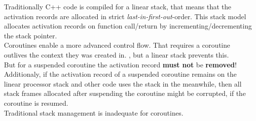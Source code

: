 Traditionally C++ code is compiled for a linear stack, that means that the
activation records are allocated in strict \emph{last-in-first-out}-order. This
stack model allocates activation records on function call/return by
incrementing/decrementing the stack pointer.\\
Coroutines enable a more advanced control flow. That requires a coroutine
outlives the context they was created in. , but a linear stack prevents this.\\
But for a suspended coroutine the activation record {\bfseries must not} be
{\bfseries removed}! Additionaly, if the activation record of a suspended
coroutine remains on the linear processor stack and other code uses the stack
in the meanwhile, then all stack frames allocated after suspending the coroutine
might be corrupted, if the coroutine is resumed.\\
Traditional stack management is inadequate for coroutines.
